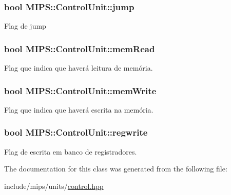 \subsubsection[{\texorpdfstring{jump}{jump}}]{\setlength{\rightskip}{0pt plus 5cm}bool M\+I\+P\+S\+::\+Control\+Unit\+::jump}\hypertarget{classMIPS_1_1ControlUnit_a13c01a649cd685fc1a52e3c3c45e96e7}{}\label{classMIPS_1_1ControlUnit_a13c01a649cd685fc1a52e3c3c45e96e7}
Flag de jump 
\subsubsection[{\texorpdfstring{mem\+Read}{memRead}}]{\setlength{\rightskip}{0pt plus 5cm}bool M\+I\+P\+S\+::\+Control\+Unit\+::mem\+Read}\hypertarget{classMIPS_1_1ControlUnit_abe9e61b37cb75b89cdde98446d89e89d}{}\label{classMIPS_1_1ControlUnit_abe9e61b37cb75b89cdde98446d89e89d}
Flag que indica que haverá leitura de memória. 
\subsubsection[{\texorpdfstring{mem\+Write}{memWrite}}]{\setlength{\rightskip}{0pt plus 5cm}bool M\+I\+P\+S\+::\+Control\+Unit\+::mem\+Write}\hypertarget{classMIPS_1_1ControlUnit_aba0c87c1f08276807cd241a9484980bc}{}\label{classMIPS_1_1ControlUnit_aba0c87c1f08276807cd241a9484980bc}
Flag que indica que haverá escrita na memória. 
\subsubsection[{\texorpdfstring{regwrite}{regwrite}}]{\setlength{\rightskip}{0pt plus 5cm}bool M\+I\+P\+S\+::\+Control\+Unit\+::regwrite}\hypertarget{classMIPS_1_1ControlUnit_a18884b753a77aa99c9ff404e16c6ac7a}{}\label{classMIPS_1_1ControlUnit_a18884b753a77aa99c9ff404e16c6ac7a}
Flag de escrita em banco de registradores. 

The documentation for this class was generated from the following file\+:\begin{DoxyCompactItemize}
\item 
include/mips/units/\hyperlink{control_8hpp}{control.\+hpp}\end{DoxyCompactItemize}
